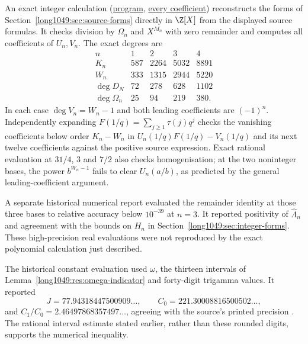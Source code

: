 An exact integer calculation (\href{https://github.com/wcook04/plectis-erdos/blob/4beca4ad0c00a626def9c73f2420e20ebf8d1968/research/experiments/erdos1049/source_polynomials.py}{program}, \href{https://github.com/wcook04/plectis-erdos/blob/4beca4ad0c00a626def9c73f2420e20ebf8d1968/research/experiments/erdos1049/receipts/source-polynomials.json}{every coefficient}) reconstructs the forms of
Section~\ref{long1049:sec:source-forms}
directly in $\Z[X]$ from the displayed source formulas. It checks
division by $\Omega_n$ and $X^{M_n}$ with zero remainder and computes
all coefficients of $U_n,V_n$. The exact degrees are
\[
\begin{array}{c|rrrr}
 n&1&2&3&4\\\hline
 K_n&587&2264&5032&8891\\
 W_n&333&1315&2944&5220\\
 \deg D_N&72&278&628&1102\\
 \deg\Omega_n&25&94&219&380.
\end{array}
\]
In each case $\deg V_n=W_n-1$ and both leading coefficients are
$(-1)^n$. Independently expanding $F(1/q)=\sum_{j\ge1}\tau(j)q^j$
checks the vanishing coefficients below order $K_n-W_n$ in
$U_n(1/q)F(1/q)-V_n(1/q)$ and its next twelve coefficients against
the positive source expression. Exact rational evaluation at
$31/4$, $3$ and $7/2$ also checks homogenisation; at the two noninteger
bases, the power $b^{W_n-1}$ fails to clear $U_n(a/b)$, as predicted
by the general leading-coefficient argument.

A separate historical numerical report evaluated the remainder identity
at those three bases to relative accuracy below $10^{-39}$ at $n=3$.
It reported positivity of $\widehat\Lambda_n$ and agreement with the
bounds on $H_n$ in Section~\ref{long1049:sec:integer-forms}. These
high-precision real evaluations were not reproduced by the exact
polynomial calculation just described.

The historical constant evaluation used $\omega$, the thirteen intervals
of Lemma~\ref{long1049:res:omega-indicator} and forty-digit trigamma values.
It reported
\[
 J=77.94318447500909\ldots,\qquad C_0=221.30008816500502\ldots,
\]
and $C_1/C_0=2.46497868357497\ldots$, agreeing with the source's printed
precision \cite[p.~162]{zudilin2004}. The rational interval estimate stated earlier, rather than these
rounded digits, supports the numerical inequality.

